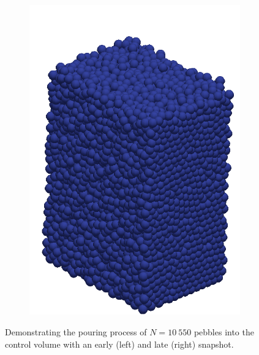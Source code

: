 \begin{figure}[t]
\begin{subfigure}[b]{0.23\textwidth}
		\includegraphics[width=\textwidth]{chapters/figures/fill03.png}
	\end{subfigure}
	\caption{Demonstrating the pouring process of $N = 10~550$ pebbles into the control volume with an early (left) and late (right) snapshot.}
\label{fig:fill01}
\end{figure}

